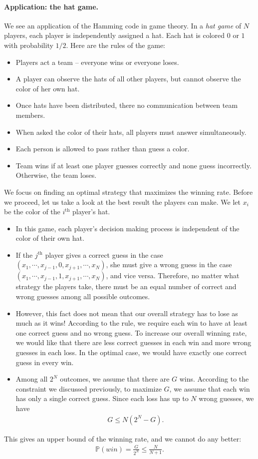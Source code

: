 \documentclass{article}
\numberwithin{equation}{section}
\newcommand{\bbP}{\mathbb{P}}
\theoremstyle{plain}
\theoremstyle{definition}
\begin{document}
\paragraph{Application: the hat game.} We see an application of the Hamming code in game theory. In a \textit{hat game} of $N$ players, each player is independently assigned a hat. Each hat is colored $0$ or $1$ with probability $1/2$. Here are the rules of the game:
\begin{itemize}
\item Players act a team – everyone wins or everyone loses.
\item A player can observe the hats of all other players, but cannot observe the color of her own hat.
\item Once hats have been distributed, there no communication between team members.
\item When asked the color of their hats, all players must answer simultaneously.
\item Each person is allowed to pass rather than guess a color.
\item Team wins if at least one player guesses correctly and none guess incorrectly. Otherwise, the team loses.
\end{itemize}
We focus on finding an optimal strategy that maximizes the winning rate. Before we proceed, let us take a look at the best result the players can make. We let $x_i$ be the color of the $i^\text{th}$ player's hat.
\begin{itemize}
\item In this game, each player's decision making process is independent of the color of their own hat. 

\item If the $j^{\mathrm{th}}$ player gives a correct guess in the case $(x_1,\cdots,x_{j-1},0,x_{j+1},\cdots,x_N)$, she must give a wrong guess in the case $(x_1,\cdots,x_{j-1},1,x_{j+1},\cdots,x_N)$, and vice versa. Therefore, no matter what strategy the players take, there must be an equal number of correct and wrong guesses among all possible outcomes.

\item However, this fact does not mean that our overall strategy has to lose as much as it wins! According to the rule, we require each win to have at least one correct guess and no wrong guess. To increase our overall winning rate, we would like that there are less correct guesses in each win and more wrong guesses in each loss. In the optimal case, we would have exactly one correct guess in every win.

\item Among all $2^N$ outcomes, we assume that there are $G$ wins. According to the constraint we discussed previously, to maximize $G$, we assume that each win has only a single correct guess. Since each loss has up to $N$ wrong guesses, we have
\begin{align*}
	G\leq N(2^N-G).
\end{align*}
\end{itemize}
This gives an upper bound of the winning rate, and we cannot do any better:
\begin{align*}
	\bbP(win)=\frac{G}{2^N}\leq\frac{N}{N+1}.
\end{align*}
\end{document}
